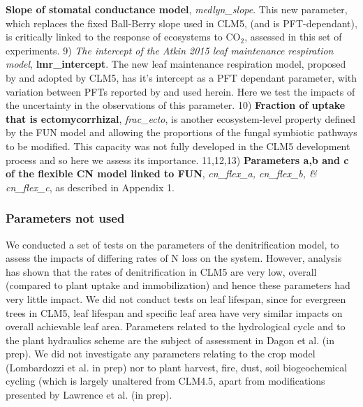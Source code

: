 \documentclass[draft,linenumbers]{agujournal}
\begin{document}
\textbf{Slope of stomatal conductance model}, \emph{medlyn\_slope}.  This new parameter, which replaces the fixed Ball-Berry slope used in CLM5, (and is PFT-dependant), is critically linked to the response of ecosystems to CO$_{2}$, assessed in this set of experiments. 9) \emph{The intercept of the Atkin 2015 leaf maintenance respiration model}, \textbf{lmr\_intercept}. The new leaf maintenance respiration model, proposed by \cite{atkin2015} and adopted by CLM5, has it's intercept as a PFT dependant parameter, with variation between PFTs reported by \cite{atkin2015} and used herein. Here we test the impacts of the uncertainty in the observations of this parameter. 10) \textbf{Fraction of uptake that is ectomycorrhizal}, \emph{frac\_ecto}, is another ecosystem-level property defined by the FUN model and allowing the proportions of the fungal symbiotic pathways to be modified. This capacity was not fully developed in the CLM5 development process and so here we assess its importance. 11,12,13) \textbf{Parameters a,b and c of the flexible CN model linked to FUN}, \emph{cn\_flex\_a, cn\_flex\_b, \& cn\_flex\_c}, as described in Appendix 1.  

\subsubsection{Parameters not used}
We conducted a set of tests on the parameters of the denitrification model, to assess the impacts of differing rates of N loss on the system. However, analysis has shown that the rates of denitrification in CLM5 are very low, overall (compared to plant uptake and immobilization) and hence these parameters had very little impact. We did not conduct tests on leaf lifespan, since for evergreen trees in CLM5, leaf lifespan and specific leaf area have very similar impacts on overall achievable leaf area. Parameters related to the hydrological cycle and to the plant hydraulics scheme are the subject of assessment in Dagon et al. (in prep). We did not investigate any parameters relating to the crop model (Lombardozzi et al. in prep) nor to plant harvest, fire, dust, soil biogeochemical cycling (which is largely unaltered from CLM4.5, \cite{koven2013} apart from modifications presented by Lawrence et al. (in prep). 
\end{document}
